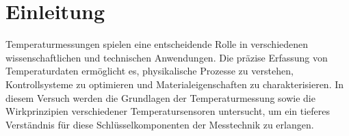 \section{Einleitung}
Temperaturmessungen spielen eine entscheidende Rolle in verschiedenen wissenschaftlichen und technischen Anwendungen. Die präzise Erfassung von Temperaturdaten ermöglicht es, physikalische Prozesse zu verstehen, Kontrollsysteme zu optimieren und Materialeigenschaften zu charakterisieren. In diesem Versuch werden die Grundlagen der Temperaturmessung sowie die Wirkprinzipien verschiedener Temperatursensoren untersucht, um ein tieferes Verständnis für diese Schlüsselkomponenten der Messtechnik zu erlangen.